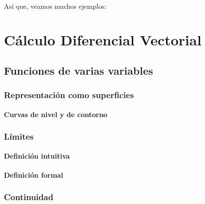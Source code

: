 \documentclass[12pt, fleqn]{report}                             %
\theoremstyle{break}                                            %
\begin{document}
            Así que, veamos muchos ejemplos:


















\part{Cálculo Diferencial Vectorial}

    \chapter{Funciones de varias variables}
    
        \section{Representación como superficies}
        
            \subsection{Curvas de nivel y de contorno}
            
        \section{Límites}
            
            \subsection{Definición intuitiva}
            
            \subsection{Definición formal}
            
        \section{Continuidad}
        
\end{document}

